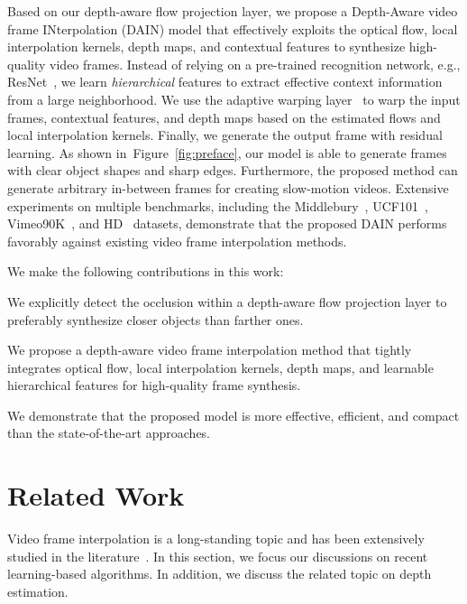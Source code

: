 \documentclass[10pt,twocolumn,letterpaper]{article}
\newcommand{\figref}[1]{Figure~\ref{fig:#1}}
\begin{document}
	Based on our depth-aware flow projection layer, we propose a Depth-Aware video frame INterpolation (DAIN) model that effectively exploits the optical flow, local interpolation kernels, depth maps, and contextual features to synthesize high-quality video frames.
Instead of relying on a pre-trained recognition network, e.g., ResNet~\cite{he2016deep}, we learn \emph{hierarchical} features to extract effective context information from a large neighborhood.
We use the adaptive warping layer~\cite{bao2018MEMC-Net} to warp the input frames, contextual features, and depth maps based on the estimated flows and local interpolation kernels.
Finally, we generate the output frame with residual learning.
As shown in~\figref{preface}, our model is able to generate frames with clear object shapes and sharp edges.
Furthermore, the proposed method can generate arbitrary in-between frames for creating slow-motion videos.
Extensive experiments on multiple benchmarks, including the Middlebury~\cite{baker2011database}, UCF101~\cite{soomro2012ucf101}, Vimeo90K~\cite{xue2017video}, and HD~\cite{bao2018MEMC-Net} datasets, demonstrate that the proposed DAIN performs favorably against existing video frame interpolation methods.
	
	
	
We make the following contributions in this work:
\begin{compactitem}
\item We explicitly detect the occlusion within a depth-aware flow projection layer to preferably synthesize closer objects than farther ones.
\item We propose a depth-aware video frame interpolation method that tightly integrates optical flow, local interpolation kernels, depth maps, and learnable hierarchical features for high-quality frame synthesis.
\item We demonstrate that the proposed model is more effective, efficient, and compact than the state-of-the-art approaches.
\end{compactitem} 
	
	
	
	
	\section{Related Work}
	Video frame interpolation is a long-standing topic and has been extensively studied in the literature~\cite{bao2018high, choi2016map, kim2014new, orchard1994overlapped,wang2010frame}.
In this section, we focus our discussions on recent learning-based algorithms.
In addition, we discuss the related topic on depth estimation.
	
\end{document}
